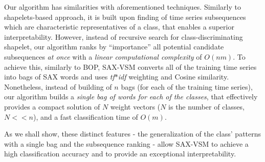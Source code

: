 \documentclass[conference]{IEEEtran}
\begin{document}
%
\enlargethispage{0.5cm}
Our algorithm has similarities with aforementioned techniques. 
Similarly to shapelets-based approach, it is built upon finding of 
time series subsequences which are characteristic representatives 
of a class, that enables a superior interpretability.
However, instead of recursive search for class-discriminating shapelet, 
our algorithm ranks by “importance” all potential candidate subsequences 
\textit{at once} with a \textit{linear computational complexity} of $O(nm)$.
To achieve this, similarly to BOP, \mbox{SAX-VSM} converts all of the 
training time series into bags of SAX words and uses \textit{tf$\ast$idf}
weighting and Cosine similarity.
Nonetheless, instead of building of $n$ bags (for each of the training time series), 
our algorithm builds a \textit{single bag of words for each of the classes}, 
that effectively provides a compact solution of $N$ weight vectors 
($N$ is the number of classes, $N<<n$), and a fast classification time of $O(m)$.

As we shall show, these distinct features - the generalization of the class' 
patterns with a single bag and the subsequence ranking -
allow SAX-VSM to achieve a high classification accuracy and to provide 
an exceptional interpretability.
\end{document}
